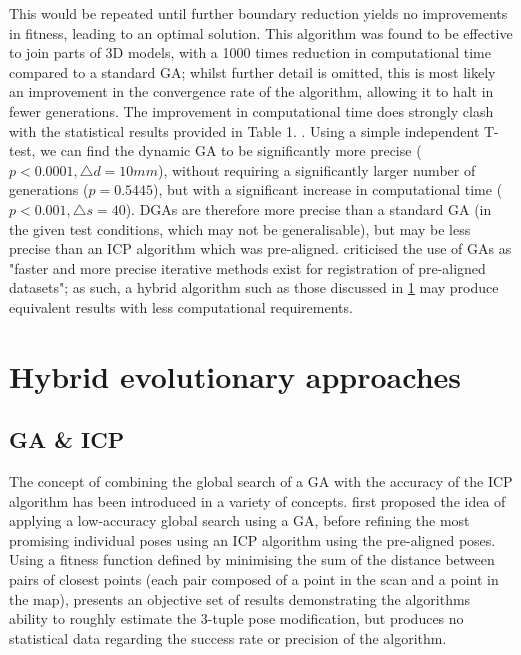 \documentclass[authoryearcitations]{UoYCSproject}
\begin{document}
This would be repeated until further boundary reduction yields no improvements in fitness, leading to an optimal solution. This algorithm was found to be effective to join parts of 3D models, with a 1000 times reduction in computational time compared to a standard GA; whilst further detail is omitted, this is most likely an improvement in the convergence rate of the algorithm, allowing it to halt in fewer generations. The improvement in computational time does strongly clash with the statistical results provided in Table 1. \cite{Chow2004-xc}. Using a simple independent T-test, we can find the dynamic GA to be significantly more precise ($p<0.0001, \triangle d = 10mm$), without requiring a significantly larger number of generations ($p=0.5445$), but with a significant increase in computational time ($p<0.001, \triangle s = 40$). DGAs are therefore more precise than a standard GA (in the given test conditions, which may not be generalisable), but may be less precise than an ICP algorithm which was pre-aligned. \citet{Lomonosov2006-vq} criticised the use of GAs as "faster and more precise iterative methods exist for registration of pre-aligned datasets"; as such, a hybrid algorithm such as those discussed in \ref{sec:hybrid_ea_approaches} may produce equivalent results with less computational requirements.

\section{Hybrid evolutionary approaches}
\label{sec:hybrid_ea_approaches}
\subsection{GA \& ICP}
The concept of combining the global search of a GA with the accuracy of the ICP algorithm has been introduced in a variety of concepts. \citet{Brunnstrom1996-vo} first proposed the idea of applying a low-accuracy global search using a GA, before refining the most promising individual poses using an ICP algorithm using the pre-aligned poses. Using a fitness function defined by minimising the sum of the distance between pairs of closest points (each pair composed of a point in the scan and a point in the map), \citeauthor{Brunnstrom1996-vo} presents an objective set of results demonstrating the algorithms ability to roughly estimate the 3-tuple pose modification, but produces no statistical data regarding the success rate or precision of the algorithm. \newline
\end{document}
